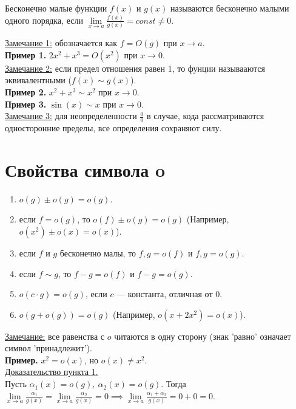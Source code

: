 \documentclass{article}
\begin{document}
\begin{definition}
    Бесконечно малые функции \(f(x)\) и \(g(x)\) называются бесконечно малыми одного порядка, если \(\displaystyle \lim\limits_{x \to a}\frac{f(x)}{g(x)} = const \neq 0\).   
\end{definition}
\noindent
\underline{Замечание 1:} обозначается как \(f = O(g)\) при \(x \to a\).\\
\textbf{Пример 1.} \(2x^2 + x^3 = O(x^2)\) при \(x \to 0\).\\
\underline{Замечание 2:} если предел отношения равен 1, то фунции называаются эквивалентными (\(f(x) \sim g(x)\)).\\
\textbf{Пример 2.} \(x^2 + x^3 \sim x^2\) при \(x \to 0\).\\
\textbf{Пример 3.} \(\sin(x) \sim x\) при \(x \to 0\).\\
\underline{Замечание 3:} для неопределенности \(\displaystyle \frac{0}{0}\) в случае, кода рассматриваются односторонние пределы, все определения сохраняют силу.

\section{Свойства символа o}
\begin{enumerate}[leftmargin=*]
  \item \(o(g) \pm o(g) = o(g)\).
  \item если \(f = o(g)\), то \(o(f) \pm o(g) = o(g)\) (Например, \(o(x^2) \pm o(x) = o(x)\)).     
  \item если \(f\) и \(g\) бесконечно малы, то \(f, g = o(f)\) и \(f, g = o(g)\).
  \item если \(f \sim g\), то \(f - g = o(f)\) и \(f - g = o(g)\).
  \item \(o(c \cdot g) = o(g)\), если \(c\) --- константа, отличная от 0.
  \item \(o(g + o(g)) = o(g)\) (Например, \(o(x + 2x^2) = o(x)\)).     
\end{enumerate}
\noindent
\underline{Замечание:} все равенства с \(o\) читаются в одну сторону (знак 'равно' означает символ 'принадлежит').\\
\textbf{Пример.} \(x^2 = o(x)\), но \(o(x) \neq x^2\).\\
\underline{Доказательство пункта 1.}\\
Пусть \(\displaystyle \alpha_{1}(x) = o(g),\ \alpha_{2}(x) = o(g)\). Тогда \(\displaystyle \lim\limits_{x \to a}\frac{\alpha_{1}}{g(x)} = \lim\limits_{x \to a}\frac{\alpha_{2}}{g(x)} = 0 \implies \lim\limits_{x \to a} \frac{\alpha_{1} + \alpha_{2}}{g(x)} = 0 + 0 = 0\).
\end{document}
